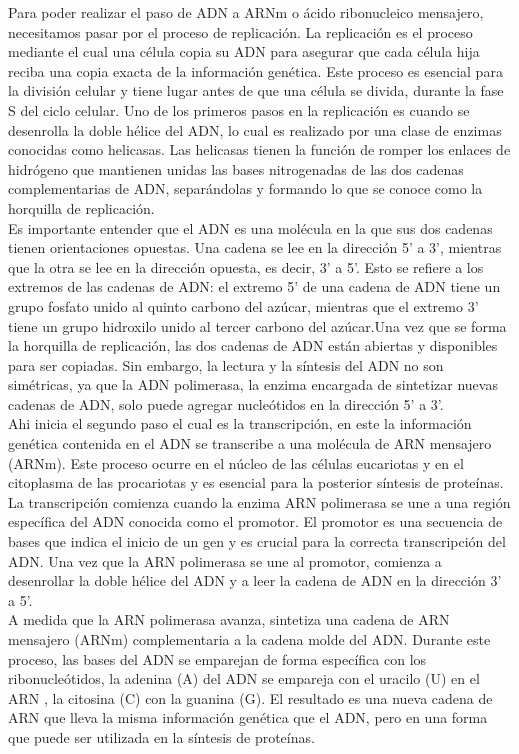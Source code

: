 Para poder realizar el paso de ADN a ARNm o ácido ribonucleico mensajero, necesitamos pasar por el proceso de replicación. La replicación es el proceso mediante el cual una célula copia su ADN para asegurar que cada célula hija reciba una copia exacta de la información genética. Este proceso es esencial para la división celular y tiene lugar antes de que una célula se divida, durante la fase S del ciclo celular. Uno de los primeros pasos en la replicación es cuando se desenrolla la doble hélice del ADN, lo cual es realizado por una clase de enzimas conocidas como helicasas. Las helicasas tienen la función de romper los enlaces de hidrógeno que mantienen unidas las bases nitrogenadas de las dos cadenas complementarias de ADN, separándolas y formando lo que se conoce como la horquilla de replicación.\\

Es importante entender que el ADN es una molécula en la que sus dos cadenas tienen orientaciones opuestas. Una cadena se lee en la dirección 5' a 3', mientras que la otra se lee en la dirección opuesta, es decir, 3' a 5'. Esto se refiere a los extremos de las cadenas de ADN: el extremo 5' de una cadena de ADN tiene un grupo fosfato unido al quinto carbono del azúcar, mientras que el extremo 3' tiene un grupo hidroxilo unido al tercer carbono del azúcar.Una vez que se forma la horquilla de replicación, las dos cadenas de ADN están abiertas y disponibles para ser copiadas. Sin embargo, la lectura y la síntesis del ADN no son simétricas, ya que la ADN polimerasa, la enzima encargada de sintetizar nuevas cadenas de ADN, solo puede agregar nucleótidos en la dirección 5' a 3'.\\

Ahi inicia el segundo paso el cual es la transcripción, en este la información genética contenida en el ADN se transcribe a una molécula de ARN mensajero (ARNm). Este proceso ocurre en el núcleo de las células eucariotas y en el citoplasma de las procariotas y es esencial para la posterior síntesis de proteínas. La transcripción comienza cuando la enzima ARN polimerasa se une a una región específica del ADN conocida como el promotor. El promotor es una secuencia de bases que indica el inicio de un gen y es crucial para la correcta transcripción del ADN. Una vez que la ARN polimerasa se une al promotor, comienza a desenrollar la doble hélice del ADN y a leer la cadena de ADN en la dirección 3' a 5'.\\

A medida que la ARN polimerasa avanza, sintetiza una cadena de ARN mensajero (ARNm) complementaria a la cadena molde del ADN. Durante este proceso, las bases del ADN se emparejan de forma específica con los ribonucleótidos, la adenina (A) del ADN se empareja con el uracilo (U) en el ARN , la citosina (C) con la guanina (G). El resultado es una nueva cadena de ARN que lleva la misma información genética que el ADN, pero en una forma que puede ser utilizada en la síntesis de proteínas.\\

